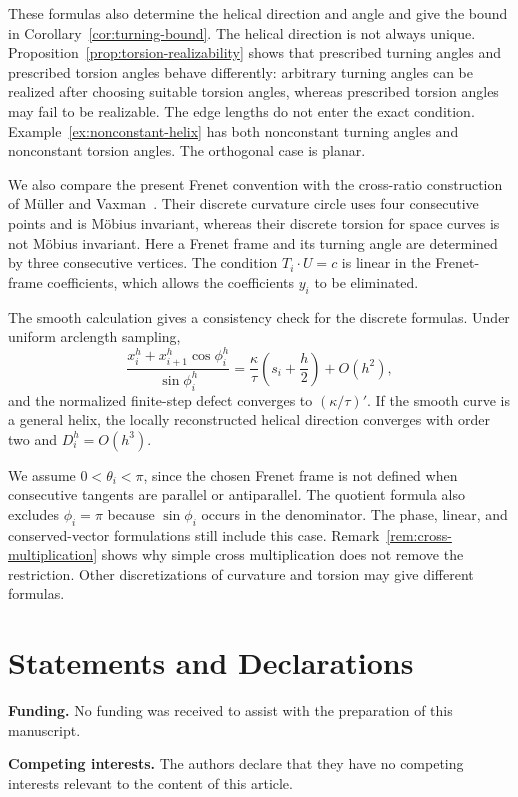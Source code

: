 \documentclass[10pt,a4paper]{amsart}
\theoremstyle{definition}
\theoremstyle{remark}
\numberwithin{equation}{section}
\begin{document}
These formulas also determine the helical direction and angle and give the bound in Corollary~\ref{cor:turning-bound}. The helical direction is not always unique. Proposition~\ref{prop:torsion-realizability} shows that prescribed turning angles and prescribed torsion angles behave differently: arbitrary turning angles can be realized after choosing suitable torsion angles, whereas prescribed torsion angles may fail to be realizable. The edge lengths do not enter the exact condition. Example~\ref{ex:nonconstant-helix} has both nonconstant turning angles and nonconstant torsion angles. The orthogonal case is planar.

We also compare the present Frenet convention with the cross-ratio construction of M\"uller and Vaxman~\cite{MullerVaxman2021}. Their discrete curvature circle uses four consecutive points and is M\"obius invariant, whereas their discrete torsion for space curves is not M\"obius invariant. Here a Frenet frame and its turning angle are determined by three consecutive vertices. The condition $T_i\cdot U=c$ is linear in the Frenet-frame coefficients, which allows the coefficients $y_i$ to be eliminated.

The smooth calculation gives a consistency check for the discrete formulas. Under uniform arclength sampling,
\[
\frac{x_i^h+x_{i+1}^h\cos\phi_i^h}{\sin\phi_i^h}
=
\frac{\kappa}{\tau}\left(s_i+\frac h2\right)+O(h^2),
\]
and the normalized finite-step defect converges to $(\kappa/\tau)'$. If the smooth curve is a general helix, the locally reconstructed helical direction converges with order two and $D_i^h=O(h^3)$.

We assume $0<\theta_i<\pi$, since the chosen Frenet frame is not defined when consecutive tangents are parallel or antiparallel. The quotient formula also excludes $\phi_i=\pi$ because $\sin\phi_i$ occurs in the denominator. The phase, linear, and conserved-vector formulations still include this case. Remark~\ref{rem:cross-multiplication} shows why simple cross multiplication does not remove the restriction. Other discretizations of curvature and torsion may give different formulas.

\section*{Statements and Declarations}

\noindent\textbf{Funding.}
No funding was received to assist with the preparation of this manuscript.

\medskip
\noindent\textbf{Competing interests.}
The authors declare that they have no competing interests relevant to the content of this article.
\end{document}
